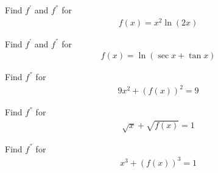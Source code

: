 \begin{exercise}
Find $f^{'}$ and $f^{''}$ for
\begin{align*}
    f(x) = x^{2}\ln(2x)
\end{align*}
\end{exercise}

\begin{exercise}
Find $f^{'}$ and $f^{''}$ for 
\begin{align*}
    f(x) = \ln(\sec x + \tan x)
\end{align*}
\end{exercise}

\begin{exercise}
Find $f^{''}$ for
\begin{align*}
    9x^{2} + (f(x))^{2} = 9
\end{align*}
\end{exercise}

\begin{exercise}
Find $f^{''}$ for 
\begin{align*}
    \sqrt{x} + \sqrt{f(x)} = 1
\end{align*}
\end{exercise}

\begin{exercise}
Find $f^{''}$ for 
\begin{align*}
    x^{3} + (f(x))^{3} = 1
\end{align*}
\end{exercise}


